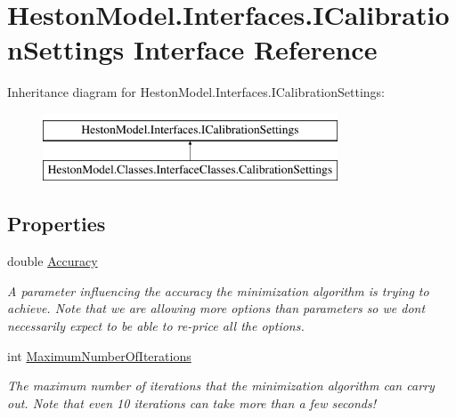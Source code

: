 \hypertarget{interface_heston_model_1_1_interfaces_1_1_i_calibration_settings}{}\section{Heston\+Model.\+Interfaces.\+I\+Calibration\+Settings Interface Reference}
\label{interface_heston_model_1_1_interfaces_1_1_i_calibration_settings}
Inheritance diagram for Heston\+Model.\+Interfaces.\+I\+Calibration\+Settings\+:\begin{figure}[H]
\begin{center}
\leavevmode
\includegraphics[height=2.000000cm]{interface_heston_model_1_1_interfaces_1_1_i_calibration_settings}
\end{center}
\end{figure}
\subsection*{Properties}
\begin{DoxyCompactItemize}
\item 
double \mbox{\hyperlink{interface_heston_model_1_1_interfaces_1_1_i_calibration_settings_a08b624ee732fc414a985af4c2fa3549f}{Accuracy}}
\begin{DoxyCompactList}\small\item\em A parameter influencing the accuracy the minimization algorithm is trying to achieve. Note that we are allowing more options than parameters so we don\textquotesingle{}t necessarily expect to be able to re-\/price all the options. \end{DoxyCompactList}\item 
int \mbox{\hyperlink{interface_heston_model_1_1_interfaces_1_1_i_calibration_settings_a191416e60c2f4e0449746c1c205628a5}{Maximum\+Number\+Of\+Iterations}}
\begin{DoxyCompactList}\small\item\em The maximum number of iterations that the minimization algorithm can carry out. Note that even 10 iterations can take more than a few seconds! \end{DoxyCompactList}\end{DoxyCompactItemize}


